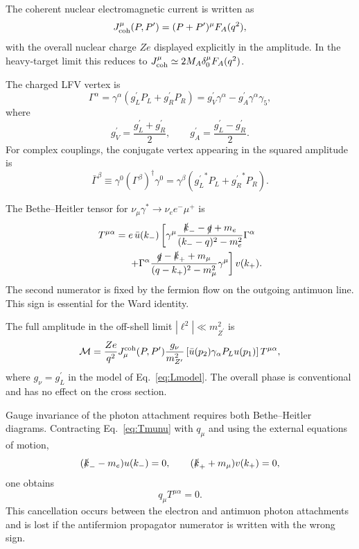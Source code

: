 \documentclass[
  aps,
  prl,
  twocolumn,
  superscriptaddress,
  amsmath, amssymb,
  floatfix, nofootinbib,
  longbibliography,
]{revtex4-2}
\newcommand{\Zp}{Z^{\prime}}
\newcommand{\mZp}{m_{\Zp}}
\newcommand{\mmu}{m_\mu}
\newcommand{\me}{m_e}
\newcommand{\gL}{{g^{\prime}_L}}
\newcommand{\gR}{{g^{\prime}_R}}
\newcommand{\gV}{{g^{\prime}_V}}
\newcommand{\gA}{{g^{\prime}_A}}
\newcommand{\gnu}{{g_\nu}}
\newcommand{\PL}{P_L}
\newcommand{\PR}{P_R}
\begin{document}
The coherent nuclear electromagnetic current is written as
\begin{equation}
  J^\mu_{\rm coh}(P,P')
  =
  (P+P')^\mu F_A(q^2),
\label{eq:Jcoh}
\end{equation}
with the overall nuclear charge $Ze$ displayed explicitly in the
amplitude.  In the heavy-target limit this reduces to
$J^\mu_{\rm coh}\simeq 2M_A\delta^\mu_0F_A(q^2)$.

The charged LFV vertex is
\begin{equation}
  \Gamma^\alpha
  =
  \gamma^\alpha(\gL\PL+\gR\PR)
  =
  \gV\gamma^\alpha-\gA\gamma^\alpha\gamma_5,
\label{eq:Gamma}
\end{equation}
where
\begin{equation}
  \gV=\frac{\gL+\gR}{2},
  \qquad
  \gA=\frac{\gL-\gR}{2}.
\end{equation}
For complex couplings, the conjugate vertex appearing in the squared
amplitude is
\begin{equation}
  \bar\Gamma^\beta
  \equiv
  \gamma^0(\Gamma^\beta)^\dagger\gamma^0
  =
  \gamma^\beta(\gL^*\PL+\gR^*\PR).
\label{eq:Gammabar}
\end{equation}

The Bethe--Heitler tensor for
$\nu_\mu\gamma^*\to\nu_e e^-\mu^+$ is
\begin{align}
  T^{\mu\alpha}
  ={}&
  e\,\bar u(k_-)
  \left[
  \gamma^\mu
  \frac{\slashed k_- -\slashed q +\me}
       {(k_- - q)^2-\me^2}
  \Gamma^\alpha
  \right.
  \nonumber\\
  &\left.
  +
  \Gamma^\alpha
  \frac{\slashed q-\slashed k_+ +\mmu}
       {(q-k_+)^2-\mmu^2}
  \gamma^\mu
  \right]
  v(k_+).
\label{eq:Tmunu}
\end{align}
The second numerator is fixed by the fermion flow on the outgoing
antimuon line.  This sign is essential for the Ward identity.

The full amplitude in the off-shell limit $|\ell^2|\ll\mZp^2$ is
\begin{equation}
  \mathcal M
  =
  \frac{Ze}{q^2}
  J^{\rm coh}_\mu(P,P')
  \frac{\gnu}{\mZp^2}
  \left[\bar u(p_2)\gamma_\alpha\PL u(p_1)\right]
  T^{\mu\alpha},
\label{eq:Mlimit-corrected}
\end{equation}
where $\gnu=\gL$ in the model of Eq.~\eqref{eq:Lmodel}.  The overall
phase is conventional and has no effect on the cross section.

Gauge invariance of the photon attachment requires both Bethe--Heitler
diagrams.  Contracting Eq.~\eqref{eq:Tmunu} with $q_\mu$ and using the
external equations of motion,
\begin{equation}
  (\slashed k_- -\me)u(k_-)=0,
  \qquad
  (\slashed k_+ +\mmu)v(k_+)=0,
\end{equation}
one obtains
\begin{equation}
  q_\mu T^{\mu\alpha}=0.
\label{eq:Ward}
\end{equation}
This cancellation occurs between the electron and antimuon photon
attachments and is lost if the antifermion propagator numerator is
written with the wrong sign.
\end{document}

